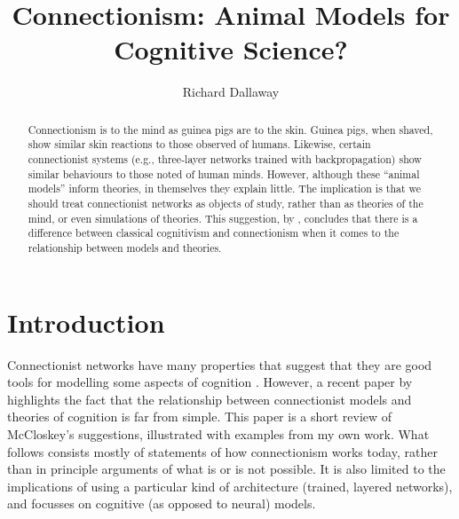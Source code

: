\newcommand{\x}[2]{\mbox{$#1\times#2$}}


\showwherepublished
{}






\author{Richard Dallaway}
\title{Connectionism: Animal Models for\\Cognitive Science?}
\maketitle

%
\begin{abstract}
Connectionism is to the mind as guinea pigs are to the skin.
Guinea pigs, when shaved, show similar skin reactions to those observed of
humans.
Likewise, certain connectionist systems (e.g., three-layer
networks trained with backpropagation) show similar behaviours to those
noted of human minds.  However, although these ``animal models'' inform
theories, in themselves they
explain little. The implication is that we should treat
connectionist networks as objects of study, rather than as theories of the
mind, or even simulations of theories. This suggestion, by
, concludes that there is a difference between classical
cognitivism and connectionism when it comes to the relationship between
models and theories.
\end{abstract}
\section*{Introduction}

Connectionist networks have many properties that suggest that they are good
tools for modelling some aspects of cognition \cite{micro}. However, a
recent paper by  highlights the fact that the relationship
between connectionist models and theories of cognition is far from simple.
This paper is a short review of McCloskey's suggestions, illustrated with
examples from my own work.  What follows consists mostly of statements of
how connectionism works today, rather than in principle arguments of what
is or is not possible.  It is also limited to the implications of using a
particular kind of architecture (trained, layered networks), and focusses on
cognitive (as opposed to neural) models.

